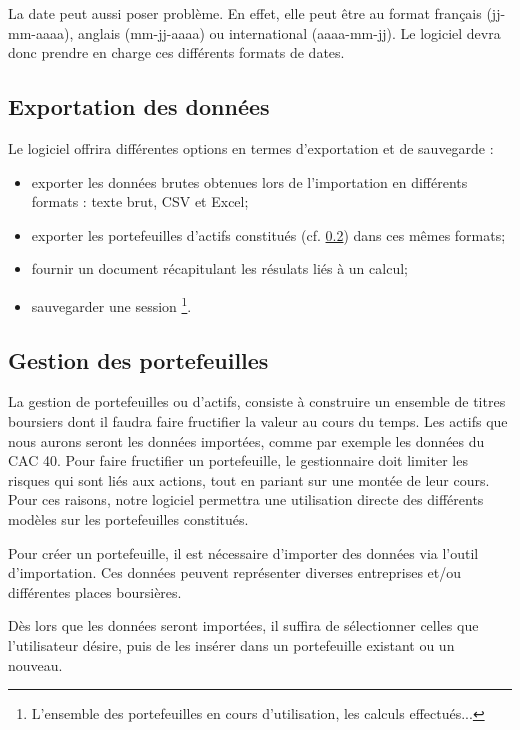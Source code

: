 		La date peut aussi poser problème. En effet, elle peut être au format français (jj-mm-aaaa), anglais (mm-jj-aaaa) ou international (aaaa-mm-jj). Le logiciel devra donc prendre en charge ces différents formats de dates.


	\subsection{Exportation des données}
		Le logiciel offrira différentes options en termes d'exportation et de sauvegarde :
		\begin{itemize}
			\item exporter les données brutes obtenues lors de l'importation en différents formats : texte brut, CSV et Excel;
			\item exporter les portefeuilles d'actifs constitués (cf. \ref{subsubsection:portefeuilles}) dans ces mêmes formats;
			\item fournir un document récapitulant les résulats liés à un calcul;
			\item sauvegarder une session \footnote{L'ensemble des portefeuilles en cours d'utilisation, les calculs effectués...}.
		\end{itemize}


	\subsection{Gestion des portefeuilles}
	\label{subsubsection:portefeuilles}

		La gestion de portefeuilles ou d'actifs, consiste à construire un ensemble de titres boursiers dont il faudra faire fructifier la valeur au cours du temps. Les actifs que nous aurons seront les données importées, comme par exemple les données du CAC 40.
		Pour faire fructifier un portefeuille, le gestionnaire doit limiter les risques qui sont liés aux actions, tout en pariant sur une montée de leur cours. Pour ces raisons, notre logiciel permettra une utilisation directe des différents modèles sur les portefeuilles constitués.


		Pour créer un portefeuille, il est nécessaire d'importer des données via l'outil d'importation. Ces données peuvent représenter diverses entreprises et/ou différentes places boursières. 

		Dès lors que les données seront importées, il suffira de sélectionner celles que l'utilisateur désire, puis de les insérer dans un portefeuille existant ou un nouveau.

